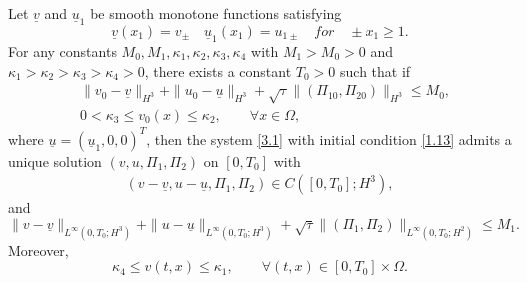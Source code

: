 \documentclass[10pt,a4paper]{amsart}
\begin{document}
\begin{theorem}\label{th3.1}
Let $\underline{v}$ and $\underline{u}_1$ be smooth monotone functions satisfying
\[
\underline{v}(x_1)=v_{\pm} \quad \underline{u}_1(x_1)=u_{1\pm} \quad for \quad \pm x_1\geq1.
\]
For any constants $M_0,M_1,\kappa_1,\kappa_2,\kappa_3,\kappa_4$ with $M_1>M_0>0$ and $\kappa_1>\kappa_2>\kappa_3>\kappa_4>0$, there exists a constant $T_0>0$ such that if
\[
\begin{aligned}
&\|v_0-\underline{v}\|_{H^3}+\|u_0-\underline{u}\|_{H^3}
+\sqrt{\tau}\|(\Pi_{10}, \Pi_{20})\|_{H^3}\leq M_0,\\
&0<\kappa_3\leq v_0(x)\leq\kappa_2,\qquad \forall x\in\Omega,
\end{aligned}
\]
where $\underline{u}=(\underline{u}_1, 0, 0)^T$, then the system \eqref{3.1} with initial condition \eqref{1.13} admits a unique solution $(v, u, \Pi_1, \Pi_2)$ on $[0,T_0]$ with
\[
\begin{aligned}
(v-\underline{v}, u-\underline{u}, \Pi_1, \Pi_2)\in C([0,T_0];H^3),
\end{aligned}
\]
and
\[
\|v-\underline{v}\|_{L^{\infty}(0,T_0;H^3)}+\|u-\underline{u}\|_{L^{\infty}(0,T_0;H^3)}
+\sqrt{\tau}\|(\Pi_1, \Pi_2)\|_{L^{\infty}(0,T_0;H^2)}\leq M_1.
\]
Moreover,
\[
\kappa_4\leq v(t,x)\leq\kappa_1,\qquad \forall(t,x)\in[0,T_0]\times\Omega.
\]
\end{theorem}
\end{document}
